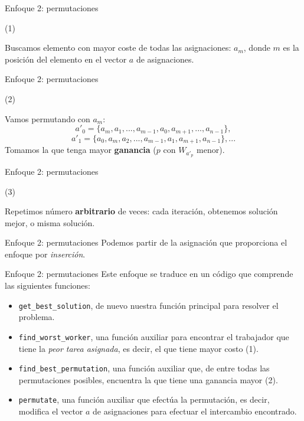 \documentclass[10pt, xcolor=table]{beamer}
\begin{document}
\begin{frame}{Enfoque 2: permutaciones}
\begin{center}
	(1)
\end{center}
Buscamos elemento con mayor coste de todas las asignaciones: $a_m$, donde $m$ es la posición del elemento en el vector $a$ de asignaciones.
\end{frame}

\begin{frame}{Enfoque 2: permutaciones}
\begin{center}
	(2)
\end{center}
Vamos permutando con $a_m$:
$$a'_0=\{a_m, a_1, ..., a_{m-1}, a_0, a_{m+1}, ..., a_{n-1}\},$$$$a'_1 = \{a_0, a_m, a_2, ..., a_{m-1}, a_1, a_{m+1}, a_{n-1}\}, ...$$
Tomamos la que tenga mayor \textbf{ganancia} ($p$ con $W_{a'_p}$ menor).
\end{frame}

\begin{frame}{Enfoque 2: permutaciones}
\begin{center}
	(3)
\end{center}
Repetimos número \textbf{arbitrario} de veces: cada iteración, obtenemos solución mejor, o misma solución.
\end{frame}

\begin{frame}{Enfoque 2: permutaciones}
Podemos partir de la asignación que proporciona el enfoque por \emph{inserción}.
\end{frame}

\begin{frame}{Enfoque 2: permutaciones}
Este enfoque se traduce en un código que comprende las siguientes funciones:

\begin{itemize}
	\item \texttt{get\_best\_solution}, de nuevo nuestra función principal para resolver el problema.
	\item \texttt{find\_worst\_worker}, una función auxiliar para encontrar el trabajador que tiene la \emph{peor tarea asignada}, es decir, el que tiene mayor costo (1).
	\item \texttt{find\_best\_permutation}, una función auxiliar que, de entre todas las permutaciones posibles, encuentra la que tiene una ganancia mayor (2).
	\item \texttt{permutate}, una función auxiliar que efectúa la permutación, es decir, modifica el vector $a$ de asignaciones para efectuar el intercambio encontrado.
\end{itemize}
\end{frame}
\end{document}
